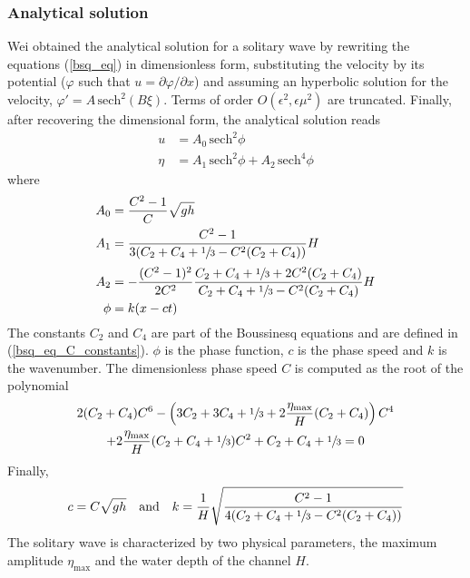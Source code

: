 \subsubsection{Analytical solution}

Wei obtained the analytical solution for a solitary wave by rewriting the equations (\ref{bsq_eq}) in dimensionless form, substituting the velocity by its potential ($\varphi$ such that $u = \partial \varphi / \partial x$) and assuming an hyperbolic solution for the velocity, $\varphi' = A\,\text{sech}^2(B\xi)$. Terms of order $O(\epsilon^2, \epsilon\mu^2)$ are truncated. Finally, after recovering the dimensional form, the analytical solution reads
\begin{align}
    u    &= A_0 \, \text{sech}^2 \phi \\
    \eta &= A_1 \, \text{sech}^2 \phi + A_2 \, \text{sech}^4 \phi
\end{align}
where
\begin{equation}
\begin{split}
    A_0 &= \frac{C^2-1}{C}\sqrt{gh} \\
    A_1 &= \frac{C^2-1}{3(C_2 + C_4 + \sfrac{1}{3} - C^2 (C_2 + C_4))} H \\[2pt]
    A_2 &= -\frac{(C^2-1)^2}{2C^2}\frac{C_2 + C_4 + \sfrac{1}{3} + 2C^2(C_2 + C_4)}{C_2 + C_4 + \sfrac{1}{3} - C^2(C_2 + C_4)} H \\
    \phi &= k (x - ct)
\end{split}
\end{equation}
The constants $C_2$ and $C_4$ are part of the Boussinesq equations and are defined in (\ref{bsq_eq_C_constants}). $\phi$ is the phase function, $c$ is the phase speed and $k$ is the wavenumber. The dimensionless phase speed $C$ is computed as the root of the polynomial
\begin{multline*}
    2(C_2 + C_4) C^6
    -\left(3C_2 + 3C_4 + \sfrac{1}{3} + 2\frac{\eta_{\text{max}}}{H}(C_2 + C_4)\right) C^4 \\
    +2\frac{\eta_{\text{max}}}{H} (C_2 + C_4 + \sfrac{1}{3}) C^2
    +C_2 + C_4 + \sfrac{1}{3} = 0
\end{multline*}
Finally,
\begin{equation*}
    c = C\sqrt{gh} \quad \text{and} \quad
    k = \frac{1}{H}\sqrt{\frac{C^2 - 1}{4(C_2 + C_4 + \sfrac{1}{3} - C^2(C_2 + C_4))}}
\end{equation*}
The solitary wave is characterized by two physical parameters, the maximum amplitude $\eta_\text{max}$ and the water depth of the channel $H$.


